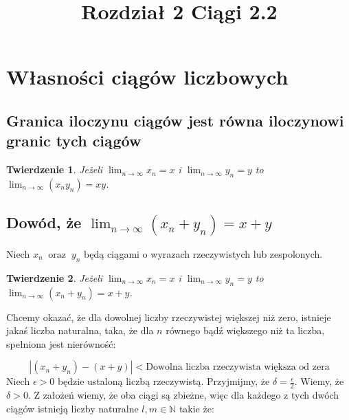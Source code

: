 \documentclass[a4paper,oneside,openright,11pt]{article}
\title{Rozdział 2 Ciągi 2.2}
\author{}
\date{}
\newtheorem{theorem}{Twierdzenie}
\numberwithin{equation}{section}
\begin{document}
\begin{titlepage}
\maketitle
\end{titlepage}


\section{Własności ciągów liczbowych}
\subsection{Granica iloczynu ciągów jest równa  iloczynowi granic tych ciągów}



\begin{theorem}
    
    Jeżeli $\lim_{n\to\infty} x_n = x$ i $\lim_{n\to\infty} y_n = y$ 
     to $\lim_{n\to\infty} (x_{n}y_{n}) = xy$.

\end{theorem}

\subsection{Dowód, że $\lim_{n\to\infty} (x_{n} + y_{n}) = x + y$}

Niech $x_{n} \;\; \textrm{oraz} \;\; y_{n}$ będą ciągami o wyrazach rzeczywistych  lub zespolonych.

\begin{theorem}
    
    Jeżeli $\lim_{n\to\infty} x_n = x$ i $\lim_{n\to\infty} y_n = y$ 
     to $\lim_{n\to\infty} (x_{n} + y_{n}) = x + y$.

\end{theorem}


\noindent
Chcemy okazać, że dla dowolnej liczby rzeczywistej większej niż zero, istnieje jakaś liczba naturalna, taka, że dla $n$ równego bądź większego niż ta liczba, spełniona jest nierówność:

\begin{equation*}
    |(x_{n} + y_{n}) - (x + y)| < \textrm{Dowolna liczba rzeczywista większa od zera}
\end{equation*}
\noindent
Niech $\epsilon > 0$ będzie ustaloną liczbą rzeczywistą. Przyjmijmy, że $\delta = \frac{\epsilon}{2}$. Wiemy, że $\delta > 0$. Z założeń wiemy, że oba ciągi są zbieżne, więc dla każdego z tych dwóch ciągów
istnieją liczby naturalne $l, m \in \mathbb{N}$ takie że:
\end{document}
